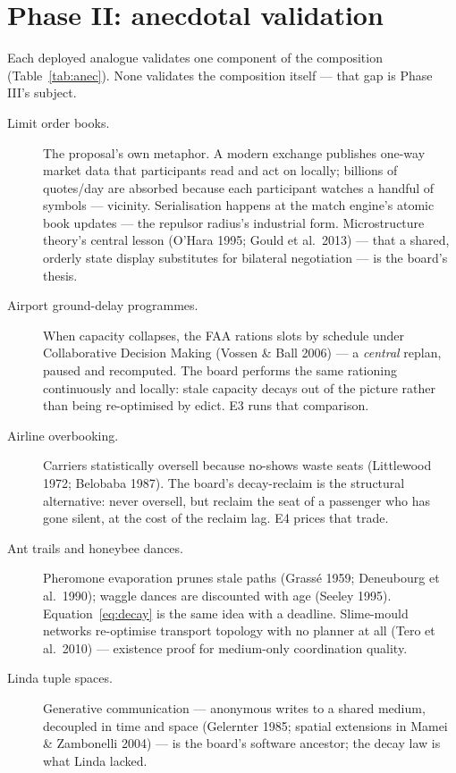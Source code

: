 \documentclass[twoside,twocolumn,usenatbib]{mnras}
\begin{document}
\section{Phase II: anecdotal validation}

\label{sec:phase2}

Each deployed analogue validates one component of the composition
(Table~\ref{tab:anec}).  None validates the composition itself ---
that gap is Phase III's subject.

\begin{description}
\item[Limit order books.] The proposal's own metaphor.  A modern
exchange publishes one-way market data that participants read and act
on locally; billions of quotes/day are absorbed because each
participant watches a handful of symbols --- vicinity.  Serialisation
happens at the match engine's atomic book updates --- the repulsor
radius's industrial form.  Microstructure theory's central lesson
(O'Hara 1995; Gould et al.\ 2013) --- that a shared, orderly state
display substitutes for bilateral negotiation --- is the board's
thesis.
\item[Airport ground-delay programmes.] When capacity collapses, the
FAA rations slots by schedule under Collaborative Decision Making
(Vossen \& Ball 2006) --- a \emph{central} replan, paused and
recomputed.  The board performs the same rationing continuously and
locally: stale capacity decays out of the picture rather than being
re-optimised by edict.  E3 runs that comparison.
\item[Airline overbooking.] Carriers statistically oversell because
no-shows waste seats (Littlewood 1972; Belobaba 1987).  The board's
decay-reclaim is the structural alternative: never oversell, but
reclaim the seat of a passenger who has gone silent, at the cost of
the reclaim lag.  E4 prices that trade.
\item[Ant trails and honeybee dances.] Pheromone evaporation prunes
stale paths (Grass\'e 1959; Deneubourg et al.\ 1990); waggle dances
are discounted with age (Seeley 1995).  Equation~\ref{eq:decay} is
the same idea with a deadline.  Slime-mould networks re-optimise
transport topology with no planner at all (Tero et al.\ 2010) ---
existence proof for medium-only coordination quality.
\item[Linda tuple spaces.] Generative communication --- anonymous
writes to a shared medium, decoupled in time and space (Gelernter
1985; spatial extensions in Mamei \& Zambonelli 2004) --- is the
board's software ancestor; the decay law is what Linda lacked.

\end{description}
\end{document}
